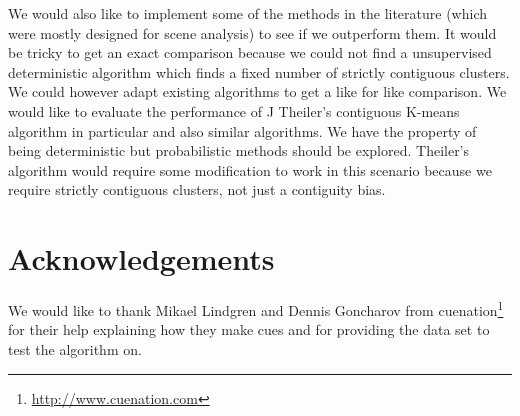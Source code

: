 \documentclass[twocolumn]{article}
\begin{document}
 We would also like to implement some of the methods in the literature (which were mostly designed for scene analysis) to see if we outperform them. It would be tricky to get an exact comparison because we could not find a unsupervised deterministic algorithm which finds a fixed number of strictly contiguous clusters. We could however adapt existing algorithms to get a like for like comparison. We would like to evaluate the performance of J Theiler's contiguous K-means algorithm in particular \cite{theiler1997contiguity} and also similar algorithms. We have the property of being deterministic but probabilistic methods should be explored. Theiler's algorithm would require some modification to work in this scenario because we require strictly contiguous clusters, not just a contiguity bias. 


\section{Acknowledgements}

We would like to thank Mikael Lindgren and Dennis Goncharov from cuenation\footnote{\url{http://www.cuenation.com}} for their help explaining how they make cues and for providing the data set to test the algorithm on.




\end{document}
